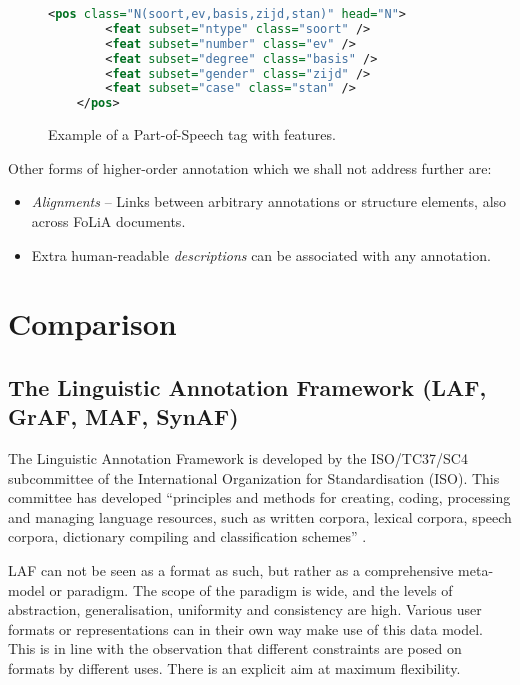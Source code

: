 \documentclass[a4paper,10pt,twoside]{article}
\begin{document}
\begin{figure}[tbh]
\begin{lstlisting}[language=xml]
    <pos class="N(soort,ev,basis,zijd,stan)" head="N">
        <feat subset="ntype" class="soort" />
        <feat subset="number" class="ev" />
        <feat subset="degree" class="basis" />
        <feat subset="gender" class="zijd" />
        <feat subset="case" class="stan" />
    </pos>
\end{lstlisting}
\caption{Example of a Part-of-Speech tag with features.\label{fig:features}}
\end{figure}

Other forms of higher-order annotation which we shall not address further are:

\begin{itemize}
  \item \emph{Alignments} -- Links \cite{XLINK} between arbitrary annotations or structure
elements, also across FoLiA documents.  
  \item Extra human-readable \emph{descriptions} can be associated with any annotation.
\end{itemize}


\section{Comparison}
\label{sec:comparison}

\subsection{The Linguistic Annotation Framework (LAF, GrAF, MAF, SynAF)}
\label{sec:LAF}

The Linguistic Annotation Framework is developed by the ISO/TC37/SC4
subcommittee of the International Organization for Standardisation (ISO). This
committee has developed ``principles and methods for creating, coding,
processing and managing language resources, such as written corpora, lexical
corpora, speech corpora, dictionary compiling and classification schemes''
\cite{LAF}. 

LAF can not be seen as a format as such, but rather as a comprehensive
meta-model or paradigm. The scope of the paradigm is wide, and the levels of
abstraction, generalisation, uniformity and consistency are high. Various user
formats or representations can in their own way make use of this data model.
This is in line with the observation that different constraints are posed on
formats by different uses.  There is an explicit aim at maximum flexibility. 
\end{document}
